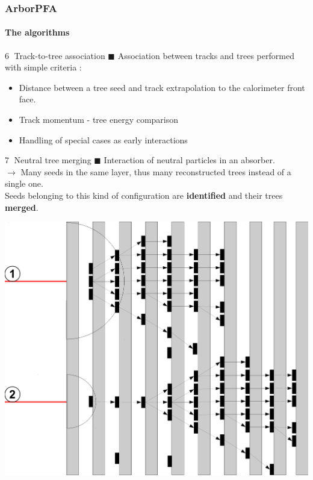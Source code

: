 \documentclass[8pt]{beamer}
\begin{document}
  \begin{frame}
  \frametitle{ArborPFA}
  \framesubtitle{The algorithms}
    \begin{minipage}{0.55\linewidth}
      \begin{block}{\textcircled{{\small 6}} Track-to-tree association}
        $\blacksquare$ Association between tracks and trees performed with simple criteria :
        \begin{itemize}
          \item Distance between a tree seed and track extrapolation to the calorimeter front face.
          \item Track momentum - tree energy comparison
          \item Handling of special cases as early interactions
        \end{itemize}
      \end{block}
      \begin{block}{\textcircled{{\small 7}} Neutral tree merging}
        $\blacksquare$ Interaction of neutral particles in an absorber. \\
        $\rightarrow$ Many seeds in the same layer, thus many reconstructed trees instead of a single one. \\
        Seeds belonging to this kind of configuration are \textbf{identified} and their trees \textbf{merged}.  
      \end{block}
    \end{minipage} \hfill
    \begin{minipage}{0.44\linewidth}
      \begin{center}
        \includegraphics[width=0.9\linewidth]{EnergyDrivenTrackClusterAssociation.pdf} \\

\end{center}
\end{minipage}
\end{frame}
\end{document}
